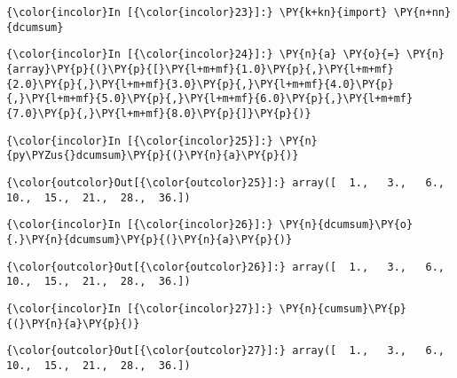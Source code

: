     \begin{Verbatim}[commandchars=\\\{\}]
{\color{incolor}In [{\color{incolor}23}]:} \PY{k+kn}{import} \PY{n+nn}{dcumsum}
\end{Verbatim}

    \begin{Verbatim}[commandchars=\\\{\}]
{\color{incolor}In [{\color{incolor}24}]:} \PY{n}{a} \PY{o}{=} \PY{n}{array}\PY{p}{(}\PY{p}{[}\PY{l+m+mf}{1.0}\PY{p}{,}\PY{l+m+mf}{2.0}\PY{p}{,}\PY{l+m+mf}{3.0}\PY{p}{,}\PY{l+m+mf}{4.0}\PY{p}{,}\PY{l+m+mf}{5.0}\PY{p}{,}\PY{l+m+mf}{6.0}\PY{p}{,}\PY{l+m+mf}{7.0}\PY{p}{,}\PY{l+m+mf}{8.0}\PY{p}{]}\PY{p}{)}
\end{Verbatim}

    \begin{Verbatim}[commandchars=\\\{\}]
{\color{incolor}In [{\color{incolor}25}]:} \PY{n}{py\PYZus{}dcumsum}\PY{p}{(}\PY{n}{a}\PY{p}{)}
\end{Verbatim}

            \begin{Verbatim}[commandchars=\\\{\}]
{\color{outcolor}Out[{\color{outcolor}25}]:} array([  1.,   3.,   6.,  10.,  15.,  21.,  28.,  36.])
\end{Verbatim}
        
    \begin{Verbatim}[commandchars=\\\{\}]
{\color{incolor}In [{\color{incolor}26}]:} \PY{n}{dcumsum}\PY{o}{.}\PY{n}{dcumsum}\PY{p}{(}\PY{n}{a}\PY{p}{)}
\end{Verbatim}

            \begin{Verbatim}[commandchars=\\\{\}]
{\color{outcolor}Out[{\color{outcolor}26}]:} array([  1.,   3.,   6.,  10.,  15.,  21.,  28.,  36.])
\end{Verbatim}
        
    \begin{Verbatim}[commandchars=\\\{\}]
{\color{incolor}In [{\color{incolor}27}]:} \PY{n}{cumsum}\PY{p}{(}\PY{n}{a}\PY{p}{)}
\end{Verbatim}

            \begin{Verbatim}[commandchars=\\\{\}]
{\color{outcolor}Out[{\color{outcolor}27}]:} array([  1.,   3.,   6.,  10.,  15.,  21.,  28.,  36.])
\end{Verbatim}
        



